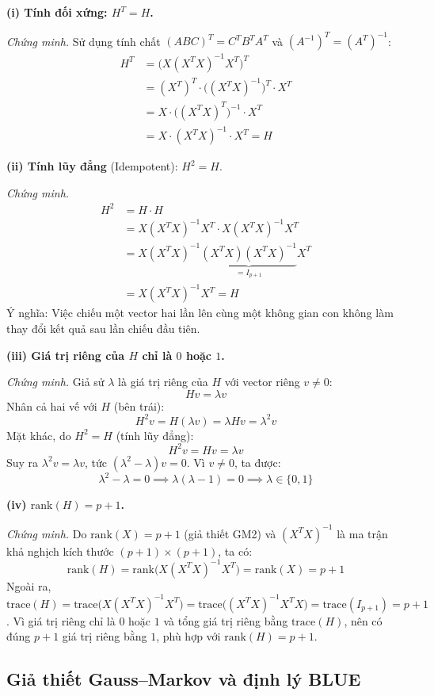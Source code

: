 \documentclass[a4paper]{article}
\begin{document}
\textbf{(i) Tính đối xứng: $H^T = H$.}

\textit{Chứng minh.} Sử dụng tính chất $(ABC)^T = C^TB^TA^T$ và $(A^{-1})^T = (A^T)^{-1}$:
\begin{align*}
H^T &= \bigl(X(X^TX)^{-1}X^T\bigr)^T \\
     &= (X^T)^T \cdot \bigl((X^TX)^{-1}\bigr)^T \cdot X^T \\
     &= X \cdot \bigl((X^TX)^T\bigr)^{-1} \cdot X^T \\
     &= X \cdot (X^TX)^{-1} \cdot X^T = H
\end{align*}

\textbf{(ii) Tính lũy đẳng} (Idempotent): \textbf{$H^2 = H$}.

\textit{Chứng minh.}
\begin{align*}
H^2 &= H \cdot H \\
     &= X(X^TX)^{-1}X^T \cdot X(X^TX)^{-1}X^T \\
     &= X(X^TX)^{-1} \underbrace{(X^TX)(X^TX)^{-1}}_{= I_{p+1}} X^T \\
     &= X(X^TX)^{-1}X^T = H
\end{align*}
Ý nghĩa: Việc chiếu một vector hai lần lên cùng một không gian con không làm thay đổi kết quả sau lần chiếu đầu tiên.

\textbf{(iii) Giá trị riêng của $H$ chỉ là $0$ hoặc $1$.}

\textit{Chứng minh.} Giả sử $\lambda$ là giá trị riêng của $H$ với vector riêng $v \neq 0$:
$$Hv = \lambda v$$
Nhân cả hai vế với $H$ (bên trái):
$$H^2 v = H(\lambda v) = \lambda Hv = \lambda^2 v$$
Mặt khác, do $H^2 = H$ (tính lũy đẳng):
$$H^2 v = Hv = \lambda v$$
Suy ra $\lambda^2 v = \lambda v$, tức $(\lambda^2 - \lambda)v = 0$. Vì $v \neq 0$, ta được:
$$\lambda^2 - \lambda = 0 \implies \lambda(\lambda - 1) = 0 \implies \lambda \in \{0, 1\}$$

\textbf{(iv) $\text{rank}(H) = p + 1$.}

\textit{Chứng minh.} Do $\text{rank}(X) = p + 1$ (giả thiết GM2) và $(X^TX)^{-1}$ là ma trận khả nghịch kích thước $(p+1)\times(p+1)$, ta có:
$$\text{rank}(H) = \text{rank}\bigl(X(X^TX)^{-1}X^T\bigr) = \text{rank}(X) = p + 1$$
Ngoài ra, $\text{trace}(H) = \text{trace}\bigl(X(X^TX)^{-1}X^T\bigr) = \text{trace}\bigl((X^TX)^{-1}X^TX\bigr) = \text{trace}(I_{p+1}) = p + 1$. Vì giá trị riêng chỉ là $0$ hoặc $1$ và tổng giá trị riêng bằng $\text{trace}(H)$, nên có đúng $p+1$ giá trị riêng bằng $1$, phù hợp với $\text{rank}(H) = p+1$. 

\subsection{Giả thiết Gauss--Markov và định lý BLUE}
\end{document}
